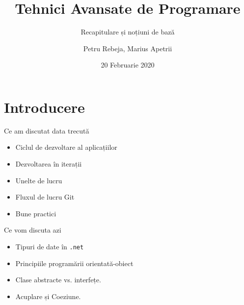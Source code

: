 \documentclass[presentation]{beamer}
\author{Petru Rebeja, Marius Apetrii}
\date{20 Februarie 2020}
\title{Tehnici Avansate de Programare}
\subtitle{Recapitulare și noțiuni de bază}
\institute[UAIC]{Facultatea de Matematică\\Universitatea Alexandru Ioan Cuza, Iași}
\begin{document}
\maketitle
\section{Introducere}
\label{sec:org39a9d24}
\begin{frame}[label={sec:orgf6925c4}]{Ce am discutat data trecută}
\pause
\begin{itemize}
\item Ciclul de dezvoltare al aplicațiilor
\item Dezvoltarea în iterații
\item Unelte de lucru
\item Fluxul de lucru Git
\item Bune practici
\end{itemize}
\end{frame}
\begin{frame}[label={sec:org55e29c5},fragile]{Ce vom discuta azi}
 \begin{itemize}
\item Tipuri de date în \texttt{.net}
\item Principiile programării orientată-obiect
\item Clase abstracte vs. interfețe.
\item Acuplare și Coeziune.
\end{itemize}
\end{frame}
\end{document}
